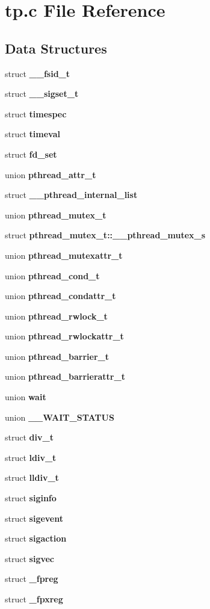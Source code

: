 \section{tp.c File Reference}
\label{tp_8c}
\subsection*{Data Structures}
\begin{DoxyCompactItemize}
\item 
struct {\bf \_\-\_\-fsid\_\-t}
\item 
struct {\bf \_\-\_\-sigset\_\-t}
\item 
struct {\bf timespec}
\item 
struct {\bf timeval}
\item 
struct {\bf fd\_\-set}
\item 
union {\bf pthread\_\-attr\_\-t}
\item 
struct {\bf \_\-\_\-pthread\_\-internal\_\-list}
\item 
union {\bf pthread\_\-mutex\_\-t}
\item 
struct {\bf pthread\_\-mutex\_\-t::\_\-\_\-pthread\_\-mutex\_\-s}
\item 
union {\bf pthread\_\-mutexattr\_\-t}
\item 
union {\bf pthread\_\-cond\_\-t}
\item 
union {\bf pthread\_\-condattr\_\-t}
\item 
union {\bf pthread\_\-rwlock\_\-t}
\item 
union {\bf pthread\_\-rwlockattr\_\-t}
\item 
union {\bf pthread\_\-barrier\_\-t}
\item 
union {\bf pthread\_\-barrierattr\_\-t}
\item 
union {\bf wait}
\item 
union {\bf \_\-\_\-WAIT\_\-STATUS}
\item 
struct {\bf div\_\-t}
\item 
struct {\bf ldiv\_\-t}
\item 
struct {\bf lldiv\_\-t}
\item 
struct {\bf siginfo}
\item 
struct {\bf sigevent}
\item 
struct {\bf sigaction}
\item 
struct {\bf sigvec}
\item 
struct {\bf \_\-fpreg}
\item 
struct {\bf \_\-fpxreg}
\item 

\end{DoxyCompactItemize}
